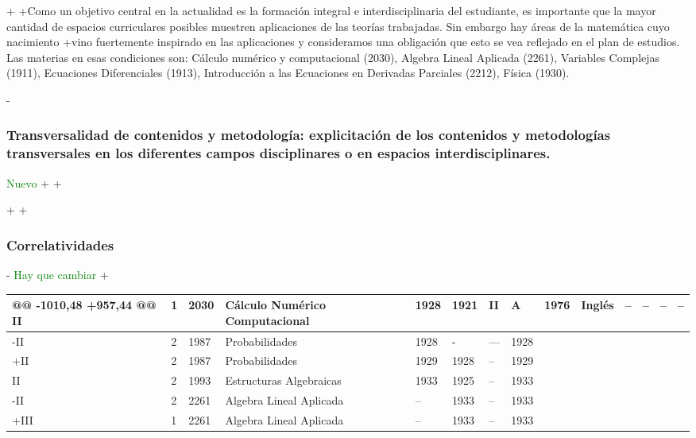 \begin{description}
{\begin{description}
+
+Como un objetivo central en la actualidad es la formación integral e interdisciplinaria del estudiante, es importante que la mayor cantidad de  espacios curriculares posibles muestren aplicaciones de las teorías trabajadas. Sin embargo hay áreas de la matemática cuyo  nacimiento
+vino fuertemente inspirado en las aplicaciones y consideramos una obligación que esto se vea reflejado en el plan de estudios. Las materias en esas condiciones son: Cálculo numérico y computacional (2030), Algebra Lineal Aplicada (2261), Variables Complejas (1911), Ecuaciones Diferenciales (1913), Introducción a las Ecuaciones en Derivadas Parciales (2212), Física (1930).
 
 
 
-\subsubsection{Transversalidad de contenidos y metodología: explicitación de los contenidos y metodologías transversales en los diferentes campos disciplinares o en espacios interdisciplinares.} \textcolor{green}{Nuevo}
+
+\end{description}
+
+
 
 \subsubsection{Correlatividades}
- \textcolor{green}{Hay que cambiar}
+ 
 \fontsize{9pt}{9pt}\selectfont
 \begin{center}
 \begin{tabularx}{\textwidth}{|l|l|l|p{3cm}|X|X|X|X|}\hline
@@ -1010,48 +957,44 @@ II   & 1  &  2030  &Cálculo Numérico Computacional &1928  &1921 &
 
 II & A &   1976 &  Inglés &--&--&--&-- \\ \hline
 
-II & 2 &1987 & Probabilidades  &1928 &-&---&1928\\ \hline
+II & 2 &1987 & Probabilidades  &1929 &1928&--&1929\\ \hline
 
 II & 2& 1993 &Estructuras Algebraicas &1933&1925&--& 1933\\ \hline
 
-II & 2 & 2261 & Algebra Lineal Aplicada &--&1933&--&1933 \\ \hline
+III & 1 & 2261 & Algebra Lineal Aplicada &--&1933&--&1933 \\ \hline
 

\end{tabularx}
\end{center}}
\end{description}
